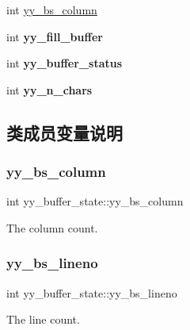 \begin{DoxyCompactItemize}
\item 
int \hyperlink{structyy__buffer__state_a10c4fcd8be759e6bf11e6d3e8cdb0307}{yy\+\_\+bs\+\_\+column}
\item 
\mbox{\label{structyy__buffer__state_a63d2afbb1d79a3fc63df9e12626f827d}} 
int {\bfseries yy\+\_\+fill\+\_\+buffer}
\item 
\mbox{\label{structyy__buffer__state_a70fd925d37a2f0454fbd0def675d106c}} 
int {\bfseries yy\+\_\+buffer\+\_\+status}
\item 
\mbox{\label{structyy__buffer__state_a06406208824817acfec2183b79080945}} 
int {\bfseries yy\+\_\+n\+\_\+chars}
\end{DoxyCompactItemize}


\subsection{类成员变量说明}
\mbox{\label{structyy__buffer__state_a10c4fcd8be759e6bf11e6d3e8cdb0307}} 
\subsubsection{\texorpdfstring{yy\+\_\+bs\+\_\+column}{yy\_bs\_column}}
{\footnotesize\ttfamily int yy\+\_\+buffer\+\_\+state\+::yy\+\_\+bs\+\_\+column}

The column count. \mbox{\label{structyy__buffer__state_a818e94bc9c766e683c60df1e9fd01199}} 
\subsubsection{\texorpdfstring{yy\+\_\+bs\+\_\+lineno}{yy\_bs\_lineno}}
{\footnotesize\ttfamily int yy\+\_\+buffer\+\_\+state\+::yy\+\_\+bs\+\_\+lineno}

The line count. 

